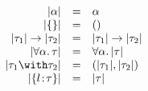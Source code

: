 
\[
\begin{array}{rcl}
  \im \alpha                     & = & \alpha \\
  \im \emptyrec                  & = & () \\
  \im {\tau_1} \to \im {\tau_2} & = & \im {\tau_1} \to \im {\tau_2} \\
  \im {\for \alpha \tau}      & = & \for \alpha \im \tau \\
  \im {\tau_1 \andop \tau_2}   & = & \pair {\im {\tau_1}} {\im {\tau_2}} \\
  \im {\recty l \tau}            & = & \im \tau
\end{array}
\]